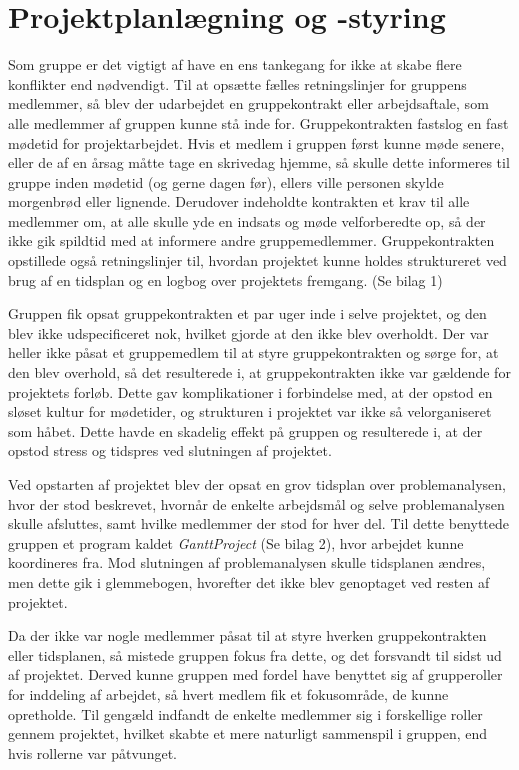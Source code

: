 \section{Projektplanlægning og -styring}

Som gruppe er det vigtigt af have en ens tankegang for ikke at skabe flere konflikter end nødvendigt. Til at opsætte fælles retningslinjer for gruppens medlemmer, så blev der udarbejdet en gruppekontrakt eller arbejdsaftale, som alle medlemmer af gruppen kunne stå inde for. Gruppekontrakten fastslog en fast mødetid for projektarbejdet. Hvis et medlem i gruppen først kunne møde senere, eller de af en årsag måtte tage en skrivedag hjemme, så skulle dette informeres til gruppe inden mødetid (og gerne dagen før), ellers ville personen skylde morgenbrød eller lignende. Derudover indeholdte kontrakten et krav til alle medlemmer om, at alle skulle yde en indsats og møde velforberedte op, så der ikke gik spildtid med at informere andre gruppemedlemmer. Gruppekontrakten opstillede også retningslinjer til, hvordan projektet kunne holdes struktureret ved brug af en tidsplan og en logbog over projektets fremgang. (Se bilag 1)

Gruppen fik opsat gruppekontrakten et par uger inde i selve projektet, og den blev ikke udspecificeret nok, hvilket gjorde at den ikke blev overholdt. Der var heller ikke påsat et gruppemedlem til at styre gruppekontrakten og sørge for, at den blev overhold, så det resulterede i, at gruppekontrakten ikke var gældende for projektets forløb. Dette gav komplikationer i forbindelse med, at der opstod en sløset kultur for mødetider, og strukturen i projektet var ikke så velorganiseret som håbet. Dette havde en skadelig effekt på gruppen og resulterede i, at der opstod stress og tidspres ved slutningen af projektet.

Ved opstarten af projektet blev der opsat en grov tidsplan over problemanalysen, hvor der stod beskrevet, hvornår de enkelte arbejdsmål og selve problemanalysen skulle afsluttes, samt hvilke medlemmer der stod for hver del. Til dette benyttede gruppen et program kaldet \textit{GanttProject} (Se bilag 2), hvor arbejdet kunne koordineres fra. Mod slutningen af problemanalysen skulle tidsplanen ændres, men dette gik i glemmebogen, hvorefter det ikke blev genoptaget ved resten af projektet.

Da der ikke var nogle medlemmer påsat til at styre hverken gruppekontrakten eller tidsplanen, så mistede gruppen fokus fra dette, og det forsvandt til sidst ud af projektet. Derved kunne gruppen med fordel have benyttet sig af grupperoller for inddeling af arbejdet, så hvert medlem fik et fokusområde, de kunne opretholde. Til gengæld indfandt de enkelte medlemmer sig i forskellige roller gennem projektet, hvilket skabte et mere naturligt sammenspil i gruppen, end hvis rollerne var påtvunget.

